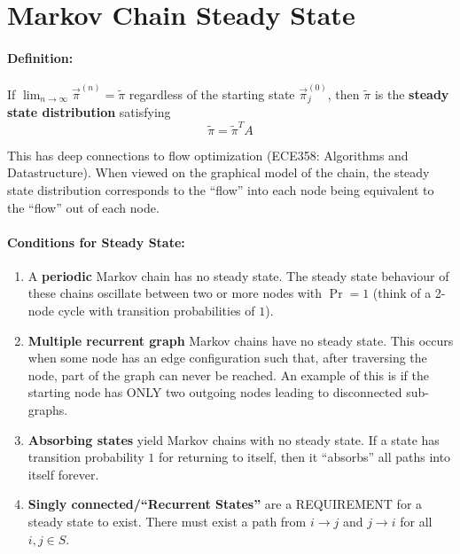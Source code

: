 \documentclass[a4paper,12pt]{report}
\begin{document}
\section{Markov Chain Steady State}

\paragraph{Definition: } If $\lim_{n\to \infty} \vec \pi^{(n)} = \tilde \pi$ regardless of the starting state $\vec \pi_j^{(0)}$, then $\tilde \pi$ is the \textbf{steady state distribution} satisfying
\begin{equation}
\tilde \pi = \tilde \pi^T A
\end{equation}

This has deep connections to flow optimization (ECE358: Algorithms and Datastructure). When viewed on the graphical model of the chain, the steady state distribution corresponds to the ``flow'' into each node being equivalent to the ``flow'' out of each node. 

\paragraph{Conditions for Steady State: } 
\begin{enumerate}
\item A \textbf{periodic} Markov chain has no steady state. The steady state behaviour of these chains oscillate between two or more nodes with $\Pr = 1$ (think of a 2-node cycle with transition probabilities of $1$).
\item \textbf{Multiple recurrent graph} Markov chains have no steady state. This occurs when some node has an edge configuration such that, after traversing the node, part of the graph can never be reached. An example of this is if the starting node has ONLY two outgoing nodes leading to disconnected sub-graphs. 
\item \textbf{Absorbing states} yield Markov chains with no steady state. If a state has transition probability $1$ for returning to itself, then it ``absorbs'' all paths into itself forever. 
\item \textbf{Singly connected/``Recurrent States''} are a REQUIREMENT for a steady state to exist. There must exist a path from $i\to j$ and $j\to i$ for all $i,j\in S$.
\end{enumerate}
\end{document}
